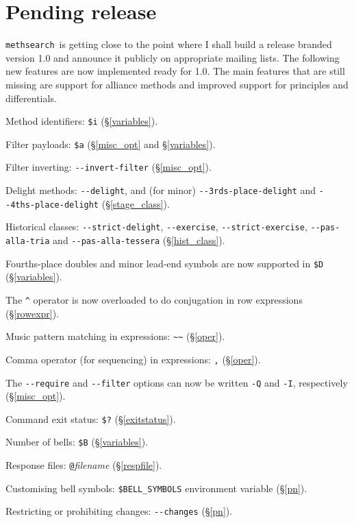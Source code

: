 \documentclass[a4paper,11pt,oneside]{book}
\def\methsearch{\texttt{meth\-search}}
\newcommand{\sref}[1]{\hyperref[#1]{\S\ref{#1}}}
\begin{document}
\section{Pending release}

\methsearch\ is getting close to the point where I shall build a release
branded version 1.0 and announce it publicly on appropriate mailing lists.
The following new features are now implemented ready for 1.0.  The main 
features that are still missing are support for alliance methods%
 and improved support for 
principles and differentials.

\begin{list}{}{\leftmargin=1em\itemsep=0em}
\item Method identifiers: \verb+$i+ (\sref{variables}).
\item Filter payloads: \verb+$a+ (\sref{misc_opt} and \sref{variables}). 
\item Filter inverting: \verb+--invert-filter+ (\sref{misc_opt}).
\item Delight methods: \verb+--delight+, and (for minor)
\verb+--3rds-place-delight+ and \verb+--4ths-place-delight+ 
(\sref{stage_class}).
\item Historical classes: \verb+--strict-delight+, \verb+--exercise+, 
\verb+--strict-exercise+, \verb+--pas-alla-tria+ and \verb+--pas-alla-tessera+
(\sref{hist_class}).
\item Fourths-place doubles and minor lead-end symbols are now supported in 
\verb+$D+ (\sref{variables}).
\item The \verb+^+ operator is now overloaded to do conjugation in row 
  expressions (\sref{rowexpr}).
\item Music pattern matching in expressions: \verb+~~+ (\sref{oper}).
\item Comma operator (for sequencing) in expressions: \verb+,+ (\sref{oper}).
\item The \verb+--require+ and \verb+--filter+ options can now be written
  \verb+-Q+ and \verb+-I+, respectively (\sref{misc_opt}). 
\item Command exit status: \verb+$?+ (\sref{exitstatus}).
\item Number of bells: \verb+$B+ (\sref{variables}).
\item Response files: \verb+@+\textit{filename} (\sref{respfile}).
\item Customising bell symbols: \verb+$BELL_SYMBOLS+ environment variable 
  (\sref{pn}).
\item Restricting or prohibiting changes: \verb+--changes+ (\sref{pn}).

\end{list}
\end{document}
